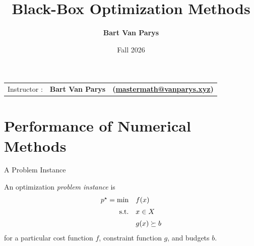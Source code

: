 \documentclass[9pt]{beamer}
\title[Continuous Optimization]{Black-Box Optimization Methods}
\author[]{\textbf{Bart Van Parys}}
\date[]{Fall 2026}
\begin{document}
\begin{frame}  

  \maketitle

  \vspace{-2em}
  
    \begin{center}
    \begin{tabular}{lll}
      Instructor : & \textbf{Bart Van Parys} & \textbf{(\href{mailto:mastermath@vanparys.xyz}{mastermath@vanparys.xyz})} \\
    \end{tabular}
  \end{center}
  
\end{frame}

\section{Performance of Numerical Methods}

\begin{frame}{A Problem Instance}

  An optimization \emph{problem instance} is
  \[
    \begin{array}{rl}
      p^\star = \min & f(x) \\[0.5em]
      \mathrm{s.t.} & x\in X \\[0.5em]
      & g(x) \succeq b \\
    \end{array}
  \]
  for a particular cost function $f$, constraint function $g$, and budgets $b$.

  \vfill


  \vfill

\end{frame}
\end{document}
